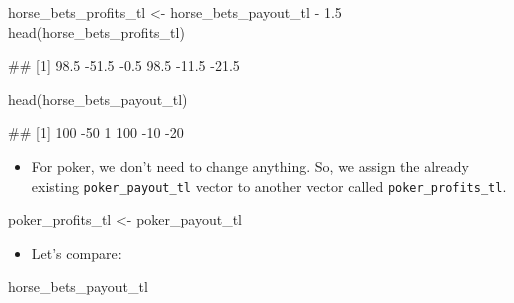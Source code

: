 \documentclass[
]{book}
\newenvironment{Shaded}{\begin{snugshade}}{\end{snugshade}}
\newcommand{\FloatTok}[1]{\textcolor[rgb]{0.00,0.00,0.81}{#1}}
\newcommand{\FunctionTok}[1]{\textcolor[rgb]{0.00,0.00,0.00}{#1}}
\newcommand{\NormalTok}[1]{#1}
\newcommand{\OtherTok}[1]{\textcolor[rgb]{0.56,0.35,0.01}{#1}}
\newcommand{\SpecialCharTok}[1]{\textcolor[rgb]{0.00,0.00,0.00}{#1}}
\providecommand{\tightlist}{%
  \setlength{\itemsep}{0pt}\setlength{\parskip}{0pt}}
\begin{document}
\begin{Shaded}
\begin{Highlighting}[]
\NormalTok{horse\_bets\_profits\_tl }\OtherTok{\textless{}{-}}\NormalTok{ horse\_bets\_payout\_tl }\SpecialCharTok{{-}} \FloatTok{1.5}
\FunctionTok{head}\NormalTok{(horse\_bets\_profits\_tl)}
\end{Highlighting}
\end{Shaded}

\begin{Shaded}
\begin{Highlighting}[]
\NormalTok{\#\# [1]  98.5 {-}51.5  {-}0.5  98.5 {-}11.5 {-}21.5}
\end{Highlighting}
\end{Shaded}

\begin{Shaded}
\begin{Highlighting}[]
\FunctionTok{head}\NormalTok{(horse\_bets\_payout\_tl)}
\end{Highlighting}
\end{Shaded}

\begin{Shaded}
\begin{Highlighting}[]
\NormalTok{\#\# [1] 100 {-}50   1 100 {-}10 {-}20}
\end{Highlighting}
\end{Shaded}

\begin{itemize}
\tightlist
\item
  For poker, we don't need to change anything. So, we assign the already existing \texttt{poker\_payout\_tl} vector to another vector called \texttt{poker\_profits\_tl}.
\end{itemize}

\begin{Shaded}
\begin{Highlighting}[]
\NormalTok{poker\_profits\_tl }\OtherTok{\textless{}{-}}\NormalTok{ poker\_payout\_tl}
\end{Highlighting}
\end{Shaded}

\begin{itemize}
\tightlist
\item
  Let's compare:
\end{itemize}

\begin{Shaded}
\begin{Highlighting}[]
\NormalTok{horse\_bets\_payout\_tl}
\end{Highlighting}
\end{Shaded}
\end{document}
